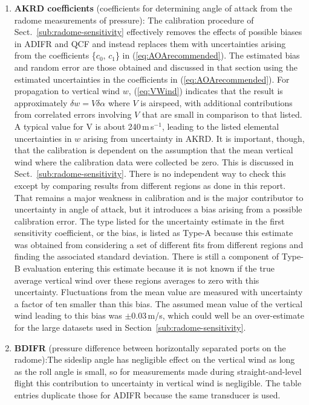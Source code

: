 \documentclass[12pt,twoside,english]{article}\usepackage[]{graphicx}\usepackage[]{color}
\let\OrgIndex\index
\renewcommand*{\index}[1]{\OrgIndex{#1}}
\begin{document}
\begin{enumerate}
\item \textbf{AKRD coefficients} (coefficients for determining angle of attack from the radome measurements of pressure): The calibration procedure of Sect.~\ref{sub:radome-sensitivity} effectively removes the effects of possible biases in ADIFR and QCF and instead replaces them with uncertainties arising from the coefficients \{$c_{0},\,c_{1}$\} in (\ref{eq:AOArecommended}). The estimated bias and random error are those obtained and discussed in that section using the estimated uncertainties in the coefficients in (\ref{eq:AOArecommended}). For propagation to vertical wind $w$, (\ref{eq:VWind}) indicates that the result is approximately $\delta w=V\delta\alpha$ where $V$ is airspeed, with additional contributions from correlated errors involving $V$ that are small in comparison to that listed. A typical value for V is about 240\,m\,s$^{-1}$, leading to the listed elemental uncertainties in $w$ arising from uncertainty in AKRD. It is important, though, that the calibration is dependent on the assumption that the mean vertical wind where the calibration data were collected be zero. This is discussed in Sect.~\ref{sub:radome-sensitivity}. There is no independent way to check this except by comparing results from different regions as done in this report. That remains a major weakness in calibration and is the major contributor to uncertainty in angle of attack, but it introduces a bias arising from a possible calibration error. The type listed for the uncertainty estimate in the first sensitivity coefficient, or the bias, is listed as Type-A because this estimate was obtained from considering a set of different fits from different regions and finding the associated standard deviation. There is still a component of Type-B evaluation entering this estimate because it is not known if the true average vertical wind over these regions averages to zero with this uncertainty. Fluctuations from the mean value are measured with uncertainty a factor of ten smaller than this bias. The assumed mean value of the vertical wind leading to this bias was $\pm$0.03\,m/s, which could well be an over-estimate for the large datasets used in Section~\ref{sub:radome-sensitivity}.  
\item \textbf{BDIFR} (pressure difference between horizontally separated ports on the radome):The sideslip angle has negligible effect on the vertical wind as long as the roll angle is small, so for measurements made during straight-and-level flight this contribution to uncertainty in vertical wind is negligible. The table entries duplicate those for ADIFR because the same transducer is used.

\end{enumerate}
\end{document}
